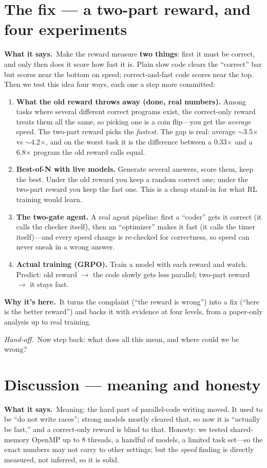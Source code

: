 \documentclass[11pt]{article}
\newcommand{\handoff}[1]{\textit{Hand-off.}\ #1}
\newcommand{\says}[1]{\textbf{What it says.}\ #1}
\newcommand{\why}[1]{\textbf{Why it's here.}\ #1}
\begin{document}
\section{The fix --- a two-part reward, and four experiments}
\says{Make the reward measure \textbf{two things}: first it must be correct, and only then
does it score how fast it is. Plain slow code clears the ``correct'' bar but scores near
the bottom on speed; correct-and-fast code scores near the top. Then we test this idea
four ways, each one a step more committed:}
\begin{enumerate}
\item \textbf{What the old reward throws away (done, real numbers).} Among tasks where
  several different correct programs exist, the correct-only reward treats them all the
  same, so picking one is a coin flip---you get the \emph{average} speed. The two-part
  reward picks the \emph{fastest}. The gap is real: average $\sim$3.5$\times$ vs
  $\sim$4.2$\times$, and on the worst task it is the difference between a 0.33$\times$ and
  a 6.8$\times$ program the old reward calls equal.
\item \textbf{Best-of-N with live models.} Generate several answers, score them, keep the
  best. Under the old reward you keep a random correct one; under the two-part reward you
  keep the fast one. This is a cheap stand-in for what RL training would learn.
\item \textbf{The two-gate agent.} A real agent pipeline: first a ``coder'' gets it
  correct (it calls the checker itself), then an ``optimizer'' makes it fast (it calls the
  timer itself)---and every speed change is re-checked for correctness, so speed can never
  sneak in a wrong answer.
\item \textbf{Actual training (GRPO).} Train a model with each reward and watch. Predict:
  old reward $\rightarrow$ the code slowly gets less parallel; two-part reward
  $\rightarrow$ it stays fast.
\end{enumerate}

\why{It turns the complaint (``the reward is wrong'') into a fix (``here is the better
reward'') and backs it with evidence at four levels, from a paper-only analysis up to real
training.}

\handoff{Now step back: what does all this mean, and where could we be wrong?}

\section{Discussion --- meaning and honesty}
\says{Meaning: the hard part of parallel-code writing moved. It used to be ``do not write
races''; strong models mostly cleared that, so now it is ``actually be fast,'' and a
correct-only reward is blind to that. Honesty: we tested shared-memory OpenMP up to 8
threads, a handful of models, a limited task set---so the exact numbers may not carry to
other settings; but the \emph{speed} finding is directly measured, not inferred, so it is
solid.}
\end{document}
